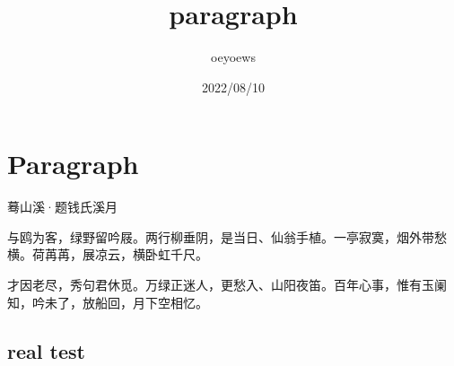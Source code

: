 \documentclass{ctexart}
\title{paragraph}
\author{oeyoews}
\date{2022/08/10}
\begin{document}
\maketitle


\newpage

\section{Paragraph}%
\label{sec:Paragraph}

\centerline{ 蓦山溪·题钱氏溪月 }

与鸥为客，绿野留吟屐。两行柳垂阴，是当日、仙翁手植。一亭寂寞，烟外带愁横。荷苒苒，展凉云，横卧虹千尺。

才因老尽，秀句君休觅。万绿正迷人，更愁入、山阳夜笛。百年心事，惟有玉阑知，吟未了，放船回，月下空相忆。

\subsection{real test}%
\label{sub:real test}
\end{document}
